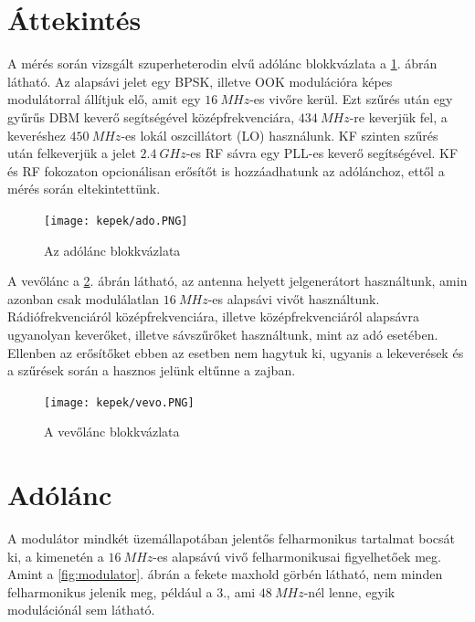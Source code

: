 \section*{Áttekintés}

A mérés során vizsgált szuperheterodin elvű adólánc blokkvázlata a \ref{fig:ado}. ábrán látható. Az alapsávi jelet egy BPSK, illetve OOK modulációra képes modulátorral állítjuk elő, amit egy $\SI{16}{MHz}$-es vivőre kerül. Ezt szűrés után egy gyűrűs DBM keverő segítségével középfrekvenciára, $\SI{434}{MHz}$-re keverjük fel, a keveréshez $\SI{450}{MHz}$-es lokál oszcillátort (LO) használunk. KF szinten szűrés után felkeverjük a jelet $\SI{2.4}{GHz}$-es RF sávra egy PLL-es keverő segítségével. KF és RF fokozaton opcionálisan erősítőt is hozzáadhatunk az adólánchoz, ettől a mérés során eltekintettünk.

\begin{figure}[H]
	\centering
	\texttt{[image: kepek/ado.PNG]}
	\caption{Az adólánc blokkvázlata}
	\label{fig:ado}
\end{figure}

A vevőlánc a \ref{fig:vevo}. ábrán látható, az antenna helyett jelgenerátort használtunk, amin azonban csak modulálatlan $\SI{16}{MHz}$-es alapsávi vivőt használtunk. Rádiófrekvenciáról középfrekvenciára, illetve középfrekvenciáról alapsávra ugyanolyan keverőket, illetve sávszűrőket használtunk, mint az adó esetében. Ellenben az erősítőket ebben az esetben nem hagytuk ki, ugyanis a lekeverések és a szűrések során a hasznos jelünk eltűnne a zajban.

\begin{figure}[H]
	\centering
	\texttt{[image: kepek/vevo.PNG]}
	\caption{A vevőlánc blokkvázlata}
	\label{fig:vevo}
\end{figure}

\section*{Adólánc}

A modulátor mindkét üzemállapotában jelentős felharmonikus tartalmat bocsát ki, a kimenetén a $\SI{16}{MHz}$-es alapsávú vivő felharmonikusai figyelhetőek meg. Amint a \ref{fig:modulator}. ábrán a fekete maxhold görbén látható, nem minden felharmonikus jelenik meg, például a 3., ami $\SI{48}{MHz}$-nél lenne, egyik modulációnál sem látható.

